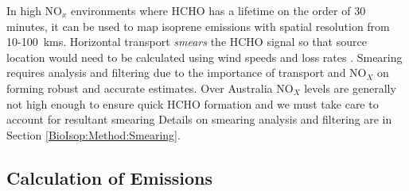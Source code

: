     
    
    
    In high NO$_x$ environments where HCHO has a lifetime on the order of 30 minutes, it can be used to map isoprene emissions with spatial resolution from 10-100~kms.
    Horizontal transport \textit{smears} the HCHO signal so that source location would need to be calculated using wind speeds and loss rates \parencite{Palmer2001,Palmer2003}.
    Smearing requires analysis and filtering due to the importance of transport and NO$_X$ on forming robust and accurate estimates.
    Over Australia NO$_X$ levels are generally not high enough to ensure quick HCHO formation and we must take care to account for resultant smearing
    Details on smearing analysis and filtering are in Section \ref{BioIsop:Method:Smearing}.
    
  \subsection{Calculation of Emissions}
    \label{BioIsop:Calculation}
   
